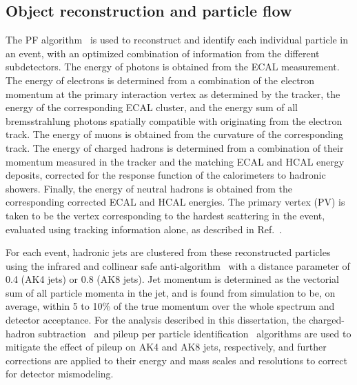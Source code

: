 \subsection{Object reconstruction and particle flow}

The PF algorithm~\cite{CMS:2017yfk} is used to reconstruct and identify each individual particle in an event, with an optimized combination of information from the different subdetectors.
The energy of photons is obtained from the ECAL measurement. 
The energy of electrons is determined from a combination of the electron momentum at the primary interaction vertex as determined by the tracker, the energy of the corresponding ECAL cluster, and the energy sum of all bremsstrahlung photons spatially compatible with originating from the electron track.
The energy of muons is obtained from the curvature of the corresponding track.
The energy of charged hadrons is determined from a combination of their momentum measured in the tracker and the matching ECAL and HCAL energy deposits, corrected for the response function of the calorimeters to hadronic showers.
Finally, the energy of neutral hadrons is obtained from the corresponding corrected ECAL and HCAL energies.
The primary vertex (PV) is taken to be the vertex corresponding to the hardest scattering in the event, evaluated using tracking information alone, as described in Ref.~\cite{CMS-TDR-15-02}.

For each event, hadronic jets are clustered from these reconstructed particles using the infrared and collinear safe anti-\kt algorithm~\cite{Cacciari:2008gp, Cacciari:2011ma} with a distance parameter of 0.4 (AK4 jets) or 0.8 (AK8 jets).
Jet momentum is determined as the vectorial sum of all particle momenta in the jet, and is found from simulation to be, on average, within 5 to 10\% of the true momentum over the whole \pt spectrum and detector acceptance. 
For the analysis described in this dissertation, the charged-hadron subtraction~\cite{CMS:2014ata} and pileup per particle identification~\cite{Bertolini:2014bba, Sirunyan:2020foa} algorithms are used to mitigate the effect of pileup on AK4 and AK8 jets, respectively, and further corrections are applied to their energy and mass scales and resolutions to correct for detector mismodeling.

